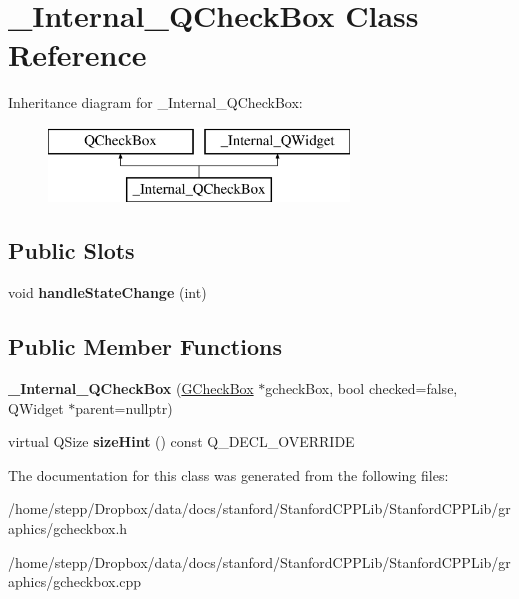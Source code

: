 \hypertarget{class__Internal__QCheckBox}{}\section{\+\_\+\+Internal\+\_\+\+Q\+Check\+Box Class Reference}
\label{class__Internal__QCheckBox}
Inheritance diagram for \+\_\+\+Internal\+\_\+\+Q\+Check\+Box\+:\begin{figure}[H]
\begin{center}
\leavevmode
\includegraphics[height=2.000000cm]{class__Internal__QCheckBox}
\end{center}
\end{figure}
\subsection*{Public Slots}
\begin{DoxyCompactItemize}
\item 
\mbox{\label{class__Internal__QCheckBox_a6904b4ee56e0e6db064abe6ff43cc9b3}} 
void {\bfseries handle\+State\+Change} (int)
\end{DoxyCompactItemize}
\subsection*{Public Member Functions}
\begin{DoxyCompactItemize}
\item 
\mbox{\label{class__Internal__QCheckBox_a42211fd163b20ce9501bf8a7a279f887}} 
{\bfseries \+\_\+\+Internal\+\_\+\+Q\+Check\+Box} (\mbox{\hyperlink{classGCheckBox}{G\+Check\+Box}} $\ast$gcheck\+Box, bool checked=false, Q\+Widget $\ast$parent=nullptr)
\item 
\mbox{\label{class__Internal__QCheckBox_a25710a6e27a9a663ff051d564a0edd43}} 
virtual Q\+Size {\bfseries size\+Hint} () const Q\+\_\+\+D\+E\+C\+L\+\_\+\+O\+V\+E\+R\+R\+I\+DE
\end{DoxyCompactItemize}


The documentation for this class was generated from the following files\+:\begin{DoxyCompactItemize}
\item 
/home/stepp/\+Dropbox/data/docs/stanford/\+Stanford\+C\+P\+P\+Lib/\+Stanford\+C\+P\+P\+Lib/graphics/gcheckbox.\+h\item 
/home/stepp/\+Dropbox/data/docs/stanford/\+Stanford\+C\+P\+P\+Lib/\+Stanford\+C\+P\+P\+Lib/graphics/gcheckbox.\+cpp\end{DoxyCompactItemize}

